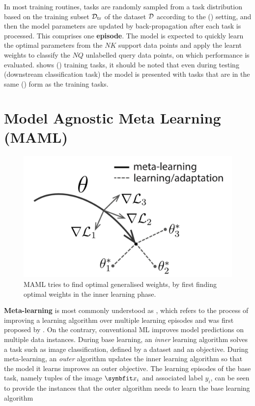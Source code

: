 In most training routines, tasks are randomly sampled from a task distribution based on the training subset $\mathcal{D}_\textup{tr}$ of the dataset $\mathcal{D}$ according to the () setting, and then the model parameters are updated by back-propagation after each task is processed.
This comprises one \textbf{episode}. The model is expected to quickly learn the optimal parameters from the $NK$ support data points and apply the learnt weights to classify the $NQ$ unlabelled query data points, on which performance is evaluated.
 shows () training tasks, it should be noted that even during testing (downstream classification task) the model is presented with tasks that are in the same () form as the training tasks.

\section{Model Agnostic Meta Learning (MAML)}\label{sec:maml}


\begin{figure}
    \centering
    \includegraphics[scale=0.23]{chapters/assets/fsl/maml.png}
    \caption{MAML tries to find optimal generalised weights, by first finding optimal weights in the inner learning phase.}
    \label{fig:maml}
\end{figure}
\textbf{Meta-learning} is most commonly understood as , which refers to the process of improving a learning algorithm over multiple learning episodes and was first proposed by \textcite{schmidhuber:1987:srl}. On the contrary, conventional ML improves model predictions on multiple data instances. 
During base learning, an \emph{inner} learning algorithm solves a task such as image classification, defined by a dataset and an objective. During meta-learning, an \emph{outer} algorithm updates the inner learning algorithm so that the model it learns improves an outer objective.
The learning episodes of the base task, namely tuples of the image $\bfitx_i$ and associated label $y_i$, can be seen to provide the instances that the outer algorithm needs to learn the base learning algorithm

